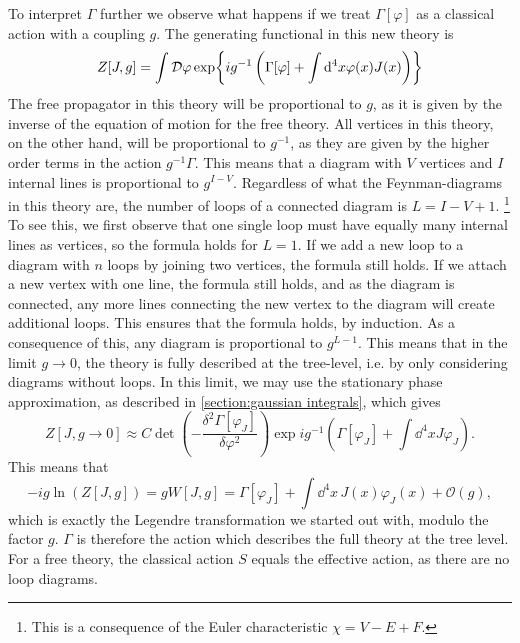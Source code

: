 To interpret $\Gamma$ further we observe what happens if we treat $\Gamma[\varphi]$ as a classical action with a coupling $g$.
The generating functional in this new theory is
\begin{equation}
    \label{partition function with g}
    Z[J, g] = \int \mathcal{D} \varphi 
    \exp{ i g^{-1} \left( \Gamma[\varphi] + \int \dd^4x \varphi(x) J(x) \right) }
\end{equation}
The free propagator in this theory will be proportional to $g$, as it is given by the inverse of the equation of motion for the free theory.
All vertices in this theory, on the other hand, will be proportional to $g^{-1}$, as they are given by the higher order terms in the action $g^{-1}\Gamma$.
This means that a diagram with $V$ vertices and $I$ internal lines is proportional to $g^{I-V}$.
Regardless of what the Feynman-diagrams in this theory are, the number of loops of a connected diagram is $L = I - V + 1$.
\footnote{This is a consequence of the Euler characteristic $\chi = V - E + F$.}
To see this, we first observe that one single loop must have equally many internal lines as vertices, so the formula holds for $L = 1$.
If we add a new loop to a diagram with $n$ loops by joining two vertices, the formula still holds.
If we attach a new vertex with one line, the formula still holds, and as the diagram is connected, any more lines connecting the new vertex to the diagram will create additional loops.
This ensures that the formula holds, by induction.
As a consequence of this, any diagram is proportional to $g^{L-1}$.
This means that in the limit $g \rightarrow 0$, the theory is fully described at the tree-level, i.e. by only considering diagrams without loops.
In this limit, we may use the stationary phase approximation, as described in \autoref{section:gaussian integrals}, which gives
\begin{equation}
    Z[J, g\rightarrow 0] \approx 
    C \det(- \frac{\delta^2 \Gamma[\varphi_J]}{\delta \varphi^2})
    \exp{i g^{-1} \left(\Gamma[\varphi_J] + \int \dd^4x J \varphi_J \right)  }.
\end{equation}
This means that
\begin{equation}
    -i g \ln(Z[J, g]) 
    = g W[J, g] 
    = \Gamma[\varphi_J] + \int \dd^4x\,  J(x) \varphi_J(x) + \mathcal{O}(g),
\end{equation}
which is exactly the Legendre transformation we started out with, modulo the factor $g$.
$\Gamma$ is therefore the action which describes the full theory at the tree level.
For a free theory, the classical action $S$ equals the effective action, as there are no loop diagrams.

